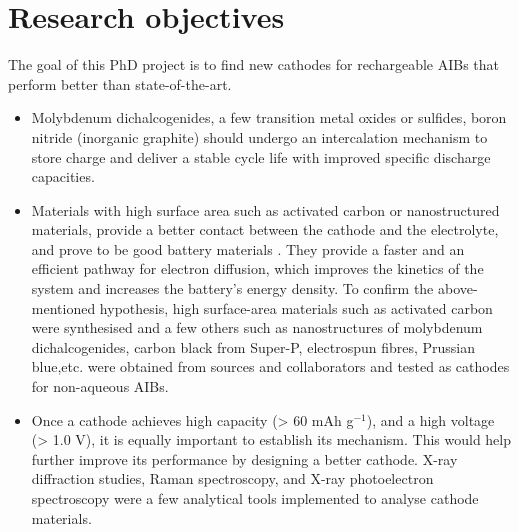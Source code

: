 \section{Research objectives}
The goal of this PhD project is to find new cathodes for rechargeable AIBs that perform better than state-of-the-art. 
\begin{itemize}
    \item Molybdenum dichalcogenides, a few transition metal oxides or sulfides, boron nitride (inorganic graphite) should undergo an intercalation mechanism to store charge and deliver a stable cycle life with improved specific discharge capacities. 
    
    \item Materials with high surface area such as activated carbon or nanostructured materials, provide a better contact between the cathode and the electrolyte, and prove to be good battery materials \cite{li_commercial_2018,satish_macroporous_2015,banerjee_mof-derived_2014,elazari_sulfur-impregnated_2011,shen_novel_2012}. They provide a faster and an efficient pathway for electron diffusion, which improves the kinetics of the system and increases the battery's energy density. To confirm the above- mentioned hypothesis, high surface-area materials such as activated carbon were synthesised and a few others such as nanostructures of molybdenum dichalcogenides, carbon black from Super-P, electrospun  fibres, Prussian blue,etc. were obtained from sources and collaborators and tested as cathodes for non-aqueous AIBs.
    
    \item Once a cathode achieves high capacity (> 60 mAh g$^{-1}$), and a high voltage (> 1.0 V), it is equally important to establish its mechanism. This would help further improve its performance by designing a better cathode. X-ray diffraction studies, Raman spectroscopy, and X-ray photoelectron spectroscopy were a few analytical tools implemented to analyse cathode materials. 

\end{itemize}






